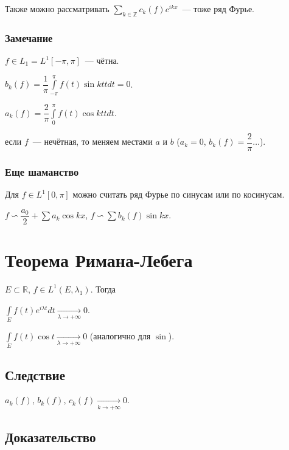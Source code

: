 \documentclass{article}
\begin{document}
        Также можно рассматривать $\sum\limits_{k \in \mathbb{Z}} c_k(f) c^{ikx}$~--- тоже ряд Фурье.
        
        \subsubsection{Замечание}
        
            $f \in L_1 = L^1 [-\pi, \pi]$~--- чётна.
            
            $b_k(f) = \dfrac{1}{\pi} \int\limits^{\pi}_{-\pi} f(t) \sin {kt} t dt = 0$.
            
            $a_k(f) = \dfrac{2}{\pi} \int\limits^{\pi}_0 f(t) \cos {kt} t dt$.
            
            если $f$~--- нечётная, то меняем местами $a$ и $b$ ($a_k = 0$, $b_k(f) = \dfrac{2}{\pi} \ldots$).
            
        \subsubsection{Еще шаманство}
        
            Для $f \in L^1 [0, \pi]$ можно считать ряд Фурье по синусам или по косинусам.
            
            $f \backsim \dfrac{a_0}{2} + \sum a_k \cos {kx}$, $f \backsim \sum b_k(f) \sin {kx}$.
    
    \newpage
    
    \section{Теорема Римана-Лебега}
    
        $E \subset \mathbb{R}$, $f \in L^1(E, \lambda_1)$. Тогда
        
        $\int\limits_E f(t) e^{i \lambda t} dt \xrightarrow[\lambda \rightarrow +\infty]{} 0$.
        
        $\int\limits_E f(t) \cos{t} \xrightarrow[\lambda \rightarrow +\infty]{} 0$ (аналогично для $\sin$).
        
        \subsection{Следствие}
        
            $a_k(f)$, $b_k(f)$, $c_k(f) \xrightarrow[k \rightarrow +\infty]{} 0$.
            
        \subsection{Доказательство}
        
\end{document}
